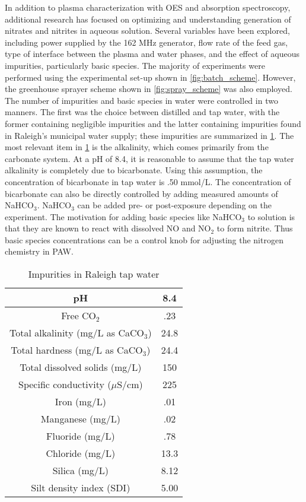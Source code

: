 In addition to plasma characterization with OES and absorption spectroscopy, additional research has focused on optimizing and understanding generation of nitrates and nitrites in aqueous solution.  Several variables have been explored, including power supplied by the 162 MHz generator, flow rate of the feed gas, type of interface between the plasma and water phases, and the effect of aqueous impurities, particularly basic species. The majority of experiments were performed using the experimental set-up shown in \cref{fig:batch_scheme}.  However, the greenhouse sprayer scheme shown in \cref{fig:spray_scheme} was also employed.  The number of impurities and basic species in water were controlled in two manners.  The first was the choice between distilled and tap water, with the former containing negligible impurities and the latter containing impurities found in Raleigh's municipal water supply; these impurities are summarized in \cref{tab:tap_water}.  The most relevant item in \cref{tab:tap_water} is the alkalinity, which comes primarily from the carbonate system.  At a pH of 8.4, it is reasonable to assume that the tap water alkalinity is completely due to bicarbonate. \cite{benjamin2014water} Using this assumption, the concentration of bicarbonate in tap water is .50 mmol/L.  The concentration of bicarbonate can also be directly controlled by adding measured amounts of NaHCO$_3$.   NaHCO$_3$ can be added pre- or post-exposure depending on the experiment.  The motivation for adding basic species like NaHCO$_3$ to solution is that they are known to react with dissolved NO and NO$_2$ to form nitrite. \cite{greenwood1984chemistry} Thus basic species concentrations can be a control knob for adjusting the nitrogen chemistry in PAW.

\begin{table}[htpb]
  \begin{center}
    \begin{tabular}{|c |c |}
      \hline
      pH & 8.4 \\\hline
      Free CO$_2$ & .23 \\\hline
      Total alkalinity (mg/L as CaCO$_3$) & 24.8 \\\hline
      Total hardness (mg/L as CaCO$_3$) & 24.4 \\\hline
      Total dissolved solids (mg/L) & 150 \\\hline
      Specific conductivity ($\mu$S/cm) & 225 \\\hline
      Iron (mg/L) & .01 \\\hline
      Manganese (mg/L) & .02 \\\hline
      Fluoride (mg/L) & .78 \\\hline
      Chloride (mg/L) & 13.3 \\\hline
      Silica (mg/L) & 8.12 \\\hline
      Silt density index (SDI) & 5.00 \\
      \hline
    \end{tabular}
  \end{center}
  \caption{Impurities in Raleigh tap water}
  \label{tab:tap_water}
\end{table}

